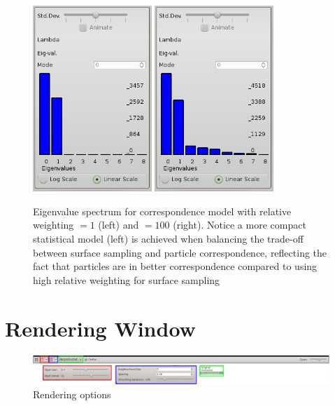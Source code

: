 \documentclass[letterpaper,12pt]{article}   %
\begin{document}
\begin{figure}[!htp]
\centering
\includegraphics[width=0.4\textwidth]{figs/spectrum_rel1.png}
\includegraphics[width=0.4\textwidth]{figs/spectrum_rel100.png}
\caption{Eigenvalue spectrum for correspondence model with relative weighting $= 1$ (left) and $ = 100$ (right). Notice a more compact statistical model (left) is achieved when balancing the trade-off between surface sampling and particle correspondence, reflecting the fact that particles are in better correspondence compared to using high relative weighting for surface sampling }
\label{fig:specturms}
\end{figure}

\section{Rendering Window}

\begin{figure}[!htp]
\centering
\includegraphics[width=1\textwidth]{figs/render.png}
\caption{Rendering options}
\label{fig:render}
\end{figure}
\end{document}
